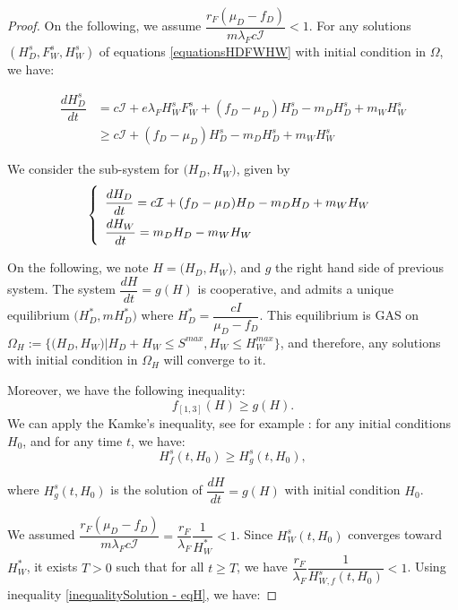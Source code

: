 \documentclass{article}
\newcommand{\lfw}{\lambda_{F}}
\newcommand{\lfw}{\lambda_{F}}
\begin{document}
\begin{proof}
On the following, we assume $\dfrac{r_F(\mu_D-f_D)}{m\lfw c\mathcal{I}} < 1$. For any solutions $(H_D^s, F_W^s, H_W^s)$ of equations \eqref{equationsHDFWHW} with initial condition in $\Omega$, we have:

\begin{align*}
\dfrac{dH_D^s}{dt} &= c\mathcal{I} + e\lfw H_W^s F_W^s + (f_D - \mu_D) H_D^s - m_D H_D^s + m_W H_W^s \\
&\geq c\mathcal{I} + (f_D - \mu_D) H_D^s - m_D H_D^s + m_W H_W^s
\end{align*}

We consider the sub-system for $\Big(H_D, H_W\Big)$, given by
\begin{equation}
\def\arraystretch{2}
\left\{ \begin{array}{l}
\dfrac{dH_D}{dt}= c\mathcal{I} + (f_D - \mu_D) H_D- m_D H_D + m_W H_W \\
\dfrac{dH_W}{dt}= m_D H_D - m_W H_W 
\end{array}\right.
\label{limitSystem - eqH}
\end{equation}

On the following, we note $H = \Big(H_D, H_W\Big)$, and $g$ the right hand side of previous system. The system $\dfrac{dH}{dt} = g(H)$ is cooperative, and admits a unique equilibrium $\Big(H_D^*, mH_D^*\Big)$ where $H_D^* = \dfrac{cI}{\mu_D - f_D}$. This equilibrium is GAS on $\Omega_H := \Big\{\Big(H_D, H_W\Big) \Big | H_D + H_W \leq S^{max}, H_W \leq H^{max}_W \Big\}$, and therefore, any solutions with initial condition in $\Omega_H$ will converge to it.

Moreover, we have the following inequality: $$f_{[1,3]}(H) \geq g(H).$$ We can apply the Kamke's inequality, see for example \cite{kirkilionis_comparison_2004}: for any initial conditions $H_0$, and for any time $t$, we have:
\begin{equation}
H_f^s(t, H_0) \geq H_g^s(t, H_0),
\label{inequalitySolution - eqH}
\end{equation}

where $H_g^s(t, H_0)$ is the solution of $\dfrac{dH}{dt} = g(H)$ with initial condition $H_0$.

\medskip

We assumed $\dfrac{r_F(\mu_D-f_D)}{m\lfw c\mathcal{I}} = \dfrac{r_F}{\lfw}\dfrac{1}{H_W^*} < 1$. Since $H_W^s(t, H_0)$ converges toward $H_W^*$, it exists $T > 0$ such that for all $t \geq T$, we have $\dfrac{r_F}{\lfw}\dfrac{1}{H_{W, f}^s(t, H_0)} < 1$. Using inequality \eqref{inequalitySolution - eqH}, we have:


\end{proof}
\end{document}
